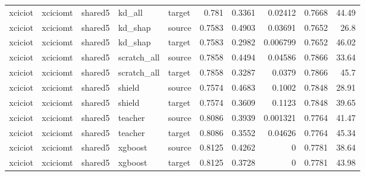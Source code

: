 \begin{table}
\begin{tabular}{lllllrrrrr}
xciciot & xciciomt & shared5 & kd_all & target & 0.781 & 0.3361 & 0.02412 & 0.7668 & 44.49 \\
xciciot & xciciomt & shared5 & kd_shap & source & 0.7583 & 0.4903 & 0.03691 & 0.7652 & 26.8 \\
xciciot & xciciomt & shared5 & kd_shap & target & 0.7583 & 0.2982 & 0.006799 & 0.7652 & 46.02 \\
xciciot & xciciomt & shared5 & scratch_all & source & 0.7858 & 0.4494 & 0.04586 & 0.7866 & 33.64 \\
xciciot & xciciomt & shared5 & scratch_all & target & 0.7858 & 0.3287 & 0.0379 & 0.7866 & 45.7 \\
xciciot & xciciomt & shared5 & shield & source & 0.7574 & 0.4683 & 0.1002 & 0.7848 & 28.91 \\
xciciot & xciciomt & shared5 & shield & target & 0.7574 & 0.3609 & 0.1123 & 0.7848 & 39.65 \\
xciciot & xciciomt & shared5 & teacher & source & 0.8086 & 0.3939 & 0.001321 & 0.7764 & 41.47 \\
xciciot & xciciomt & shared5 & teacher & target & 0.8086 & 0.3552 & 0.04626 & 0.7764 & 45.34 \\
xciciot & xciciomt & shared5 & xgboost & source & 0.8125 & 0.4262 & 0 & 0.7781 & 38.64 \\
xciciot & xciciomt & shared5 & xgboost & target & 0.8125 & 0.3728 & 0 & 0.7781 & 43.98 \\
\bottomrule
\end{tabular}
\end{table}
